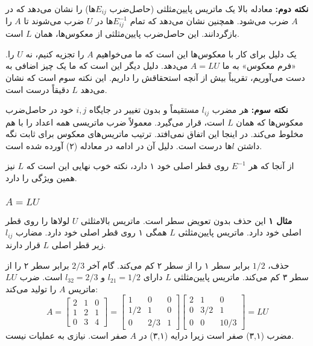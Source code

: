 \documentclass[12pt, a4paper]{book}
\begin{document}
	\textbf{نکته دوم:} معادله بالا یک ماتریس پایین‌مثلثی (حاصل‌ضرب $E_{ij}$ها) را نشان می‌دهد که در $A$ ضرب می‌شود. همچنین نشان می‌دهد که تمام $E_{ij}^{-1}$ها در $U$ ضرب می‌شوند تا $A$ را بازگردانند. این حاصل‌ضرب پایین‌مثلثی از معکوس‌ها، همان $L$ است.
	
	یک دلیل برای کار با معکوس‌ها این است که ما می‌خواهیم $A$ را تجزیه کنیم، نه $U$ را. «فرم معکوس» به ما $A=LU$ می‌دهد. دلیل دیگر این است که ما یک چیز اضافی به دست می‌آوریم، تقریباً بیش از آنچه استحقاقش را داریم. این نکته سوم است که نشان می‌دهد $L$ دقیقاً درست است.
	
	\textbf{نکته سوم:} هر مضرب $l_{ij}$ مستقیماً و بدون تغییر در جایگاه $i,j$ خود در حاصل‌ضرب معکوس‌ها که همان $L$ است، قرار می‌گیرد. معمولاً ضرب ماتریسی همه اعداد را با هم مخلوط می‌کند. در اینجا این اتفاق نمی‌افتد. ترتیب ماتریس‌های معکوس برای ثابت نگه داشتن $l$ها درست است. دلیل آن در ادامه در معادله (۲) آورده شده است.
	
	از آنجا که هر $E^{-1}$ روی قطر اصلی خود ۱ دارد، نکته خوب نهایی این است که $L$ نیز همین ویژگی را دارد.
	
	\subsubsection*{$A=LU$}
	\textbf{مثال ۱}
	این حذف بدون تعویض سطر است. ماتریس بالامثلثی $U$ لولاها را روی قطر اصلی خود دارد. ماتریس پایین‌مثلثی $L$ همگی ۱ روی قطر اصلی خود دارد. مضارب $l_{ij}$ زیر قطر اصلی $L$ قرار دارند.
	
	حذف، $1/2$ برابر سطر ۱ را از سطر ۲ کم می‌کند. گام آخر $2/3$ برابر سطر ۲ را از سطر ۳ کم می‌کند. ماتریس پایین‌مثلثی $L$ دارای $l_{21} = 1/2$ و $l_{32} = 2/3$ است. ضرب $LU$ ماتریس $A$ را تولید می‌کند:
	\[ A = \begin{bmatrix} 2 & 1 & 0 \\ 1 & 2 & 1 \\ 0 & 3 & 4 \end{bmatrix} = \begin{bmatrix} 1 & 0 & 0 \\ 1/2 & 1 & 0 \\ 0 & 2/3 & 1 \end{bmatrix} \begin{bmatrix} 2 & 1 & 0 \\ 0 & 3/2 & 1 \\ 0 & 0 & 10/3 \end{bmatrix} = LU \]
	مضرب (۳,۱) صفر است زیرا درایه (۳,۱) در $A$ صفر است. نیازی به عملیات نیست.
	
\end{document}
